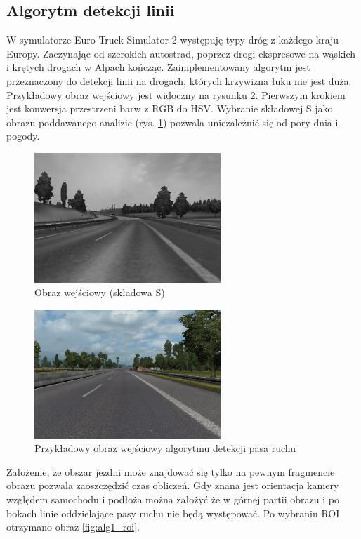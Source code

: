 \subsection{Algorytm detekcji linii}

W symulatorze Euro Truck Simulator 2 występuję typy dróg z każdego kraju Europy. 
Zaczynając od szerokich autostrad, poprzez drogi ekspresowe na wąskich i krętych drogach w Alpach kończąc. Zaimplementowany algorytm jest przeznaczony do detekcji linii na drogach, których krzywizna łuku nie jest duża. 
Przykładowy obraz wejściowy jest widoczny na rysunku \ref{fig:inputimg2}. %
Pierwszym krokiem jest konwersja przestrzeni barw z RGB do HSV. 
Wybranie składowej S jako obrazu poddawanego analizie (rys. \ref{fig:alg1_S}) pozwala uniezależnić się od pory dnia i pogody.

\begin{figure}
  \centering
  \includegraphics[width=7cm]{img/alg1_gray.jpg}
  \caption{Obraz wejściowy (składowa S)}
  \label{fig:alg1_S}
\end{figure}

\begin{figure}
  \centering
  \includegraphics[width=7cm]{img/input.png}
  \caption{Przykładowy obraz wejściowy algorytmu detekcji pasa ruchu}
  \label{fig:inputimg2}
\end{figure}
  
Założenie, że obszar jezdni może znajdować się tylko na pewnym fragmencie obrazu pozwala zaoszczędzić czas obliczeń. Gdy znana jest orientacja kamery względem samochodu i podłoża można założyć że w górnej partii obrazu i po bokach linie oddzielające pasy ruchu nie będą występować.%
Po wybraniu ROI otrzymano obraz \ref{fig:alg1_roi}.

